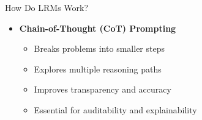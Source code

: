 \begin{frame}[allowframebreaks]{How Do LRMs Work?}
\begin{itemize}
\begin{itemize}
            \item Generic prompts may not trigger deep reasoning
        \end{itemize}
        \item \textbf{Chain-of-Thought (CoT) Prompting}
        \begin{itemize}
            \item Breaks problems into smaller steps
            \item Explores multiple reasoning paths
            \item Improves transparency and accuracy
            \item Essential for auditability and explainability
        \end{itemize}
    \end{itemize}
\end{frame}


